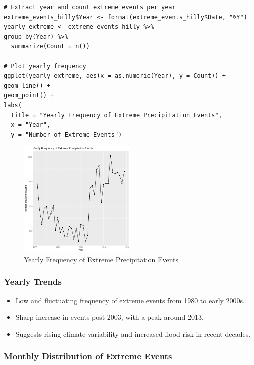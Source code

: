 \begin{verbatim}
# Extract year and count extreme events per year
extreme_events_hilly$Year <- format(extreme_events_hilly$Date, "%Y")
yearly_extreme <- extreme_events_hilly %>%
group_by(Year) %>%
  summarize(Count = n())

# Plot yearly frequency
ggplot(yearly_extreme, aes(x = as.numeric(Year), y = Count)) +
geom_line() +
geom_point() +
labs(
  title = "Yearly Frequency of Extreme Precipitation Events",
  x = "Year",
  y = "Number of Extreme Events")
\end{verbatim}

\begin{figure}[h]
    \centering
    \includegraphics[width=0.5\textwidth]{figures/trend_hilly.jpg}
    \caption{Yearly Frequency of Extreme Precipitation Events}
\end{figure}

\subsubsection*{Yearly Trends}

\begin{itemize}
    \item Low and fluctuating frequency of extreme events from 1980 to early 2000s.
    \item Sharp increase in events post-2003, with a peak around 2013.
    \item Suggests rising climate variability and increased flood risk in recent decades.
\end{itemize}

\subsubsection*{Monthly Distribution of Extreme Events}

